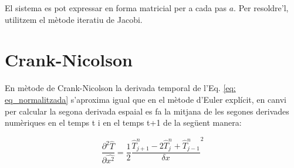 \documentclass[11pt]{article}
\begin{document}
El sistema es pot expressar en forma matricial per a cada pas $a$. Per resoldre'l, utilitzem el mètode iteratiu de Jacobi.

\section{Crank-Nicolson}
En mètode de Crank-Nicolson la derivada temporal de l'Eq. \eqref{eq: eq_normalitzada} s'aproxima igual que en el mètode d'Euler explícit, en canvi per calcular la segona derivada espaial es fa la mitjana de les segones derivades numèriques en el temps t i en el temps t+1 de la següent manera:

\begin{equation}
\frac{\partial^2\hat{T}}{\partial \hat{x^2}} = \frac{1}{2}\frac{\hat{T}_{j+1}^n-2\hat{T}_{j}^n+\hat{T}_{j-1}^n}{\delta x}^2
\end{equation}
\end{document}
